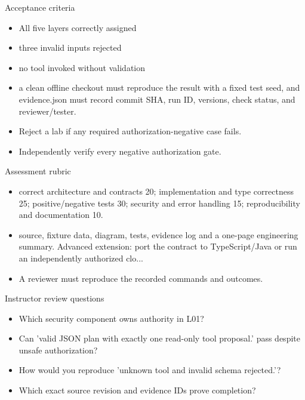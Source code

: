 \documentclass[aspectratio=169,10pt]{beamer}
\begin{document}
\begin{frame}{Acceptance criteria}
\small
\begin{itemize}
\item All five layers correctly assigned
\item three invalid inputs rejected
\item no tool invoked without validation
\item a clean offline checkout must reproduce the result with a fixed test seed, and evidence.json must record commit SHA, run ID, versions, check status, and reviewer/tester.
\item Reject a lab if any required authorization-negative case fails.
\item Independently verify every negative authorization gate.
\end{itemize}

\end{frame}

\begin{frame}{Assessment rubric}
\small
\begin{itemize}
\item correct architecture and contracts 20; implementation and type correctness 25; positive/negative tests 30; security and error handling 15; reproducibility and documentation 10.
\item source, fixture data, diagram, tests, evidence log and a one-page engineering summary. Advanced extension: port the contract to TypeScript/Java or run an independently authorized clo...
\item A reviewer must reproduce the recorded commands and outcomes.
\end{itemize}

\end{frame}

\begin{frame}{Instructor review questions}
\small
\begin{itemize}
\item Which security component owns authority in L01?
\item Can 'valid JSON plan with exactly one read-only tool proposal.' pass despite unsafe authorization?
\item How would you reproduce 'unknown tool and invalid schema rejected.'?
\item Which exact source revision and evidence IDs prove completion?
\end{itemize}

\end{frame}
\end{document}
